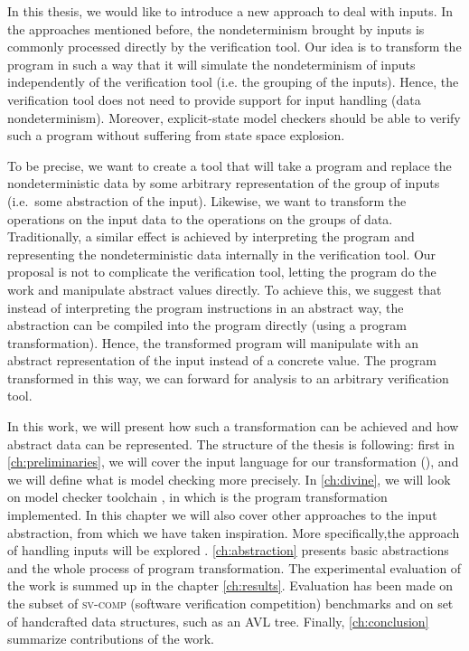 In this thesis, we would like to introduce a new approach to deal with inputs.
In the approaches mentioned before, the nondeterminism brought by inputs is
commonly processed directly by the verification tool. Our idea is to transform
the program in such a way that it will simulate the nondeterminism of inputs
independently of the verification tool (i.e. the grouping of the inputs). Hence,
the verification tool does not need to provide support for input handling (data
nondeterminism). Moreover, explicit-state model checkers should be able
to verify such a program without suffering from state space explosion.

To be precise, we want to create a tool that will take a program and replace the
nondeterministic data by some arbitrary representation of the group of inputs
(i.e.~some abstraction of the input).  Likewise, we want to transform the
operations on the input data to the operations on the groups of
data. Traditionally, a similar
effect is achieved by interpreting the program and representing the
nondeterministic data internally in the verification tool. Our proposal is
not to complicate the verification tool, letting the program do the work and
manipulate abstract values directly. To achieve this, we suggest that
instead of interpreting the program instructions in an abstract way, the
abstraction can be compiled into the program directly (using a program
transformation). Hence, the transformed program will manipulate with
an abstract representation of the input instead of a concrete value.
The program transformed in this way, we can forward for analysis to
an arbitrary verification tool.

In this work, we will present how such a transformation can be achieved and how
abstract data can be represented. The structure of the thesis is following:
first in \autoref{ch:preliminaries}, we will cover the input language for our
transformation (\LLVM), and we will define what is model checking more
precisely. In \autoref{ch:divine}, we will look on \DIVINE model checker
toolchain \cite{Divine17}, in which is the program transformation implemented.
In this chapter we will also cover other approaches to the input abstraction,
from which we have taken inspiration. More specifically,the \SymDIVINE
approach of handling inputs will be explored \cite{Mrazek16}. \autoref{ch:abstraction}
presents basic abstractions and the whole process of program transformation.
The experimental evaluation of the work is summed up in the chapter
\autoref{ch:results}.  Evaluation has been made on the subset of
\textsc{sv-comp} (software verification competition) benchmarks
\cite{Beyer17} and on set of handcrafted data structures, such as an AVL
tree. Finally, \autoref{ch:conclusion} summarize contributions of the work.



